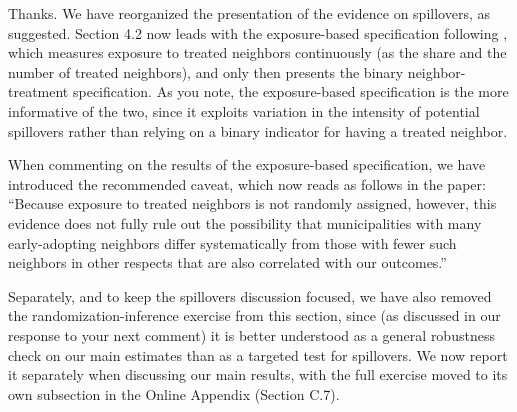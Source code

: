

Thanks. We have reorganized the presentation of the evidence on spillovers, as suggested. Section 4.2 now leads with the exposure-based specification following \citet{crepon2013}, which measures exposure to treated neighbors continuously (as the share and the number of treated neighbors), and only then presents the binary neighbor-treatment specification. As you note, the exposure-based specification is the more informative of the two, since it exploits variation in the intensity of potential spillovers rather than relying on a binary indicator for having a treated neighbor.

When commenting on the results of the exposure-based specification, we have introduced the recommended caveat, which now reads as follows in the paper: ``Because exposure to treated neighbors is not randomly assigned, however, this evidence does not fully rule out the possibility that municipalities with many early-adopting neighbors differ systematically from those with fewer such neighbors in other respects that are also correlated with our outcomes.''

Separately, and to keep the spillovers discussion focused, we have also removed the randomization-inference exercise from this section, since (as discussed in our response to your next comment) it is better understood as a general robustness check on our main estimates than as a targeted test for spillovers. We now report it separately when discussing our main results, with the full exercise moved to its own subsection in the Online Appendix (Section C.7).